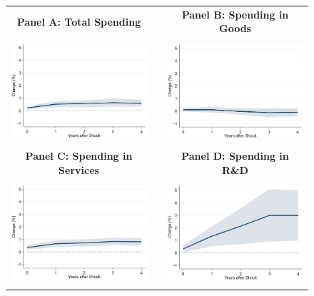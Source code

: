 \documentclass[dv_diss_main.tex]{subfiles}
\begin{document}
\begin{figure}[H]
    \begin{center}
    \begin{tabular}[c]{ccc}
    
    \normalsize{\bf Panel A: Total Spending} & & \normalsize{\bf Panel B: Spending in Goods} \\
    {\includegraphics[height=1.5in,width=2.8in]{figures/graph_Rn_wages_lv_Rn_ms_lv.png}} & & {\includegraphics[height=1.5in,width=2.8in]{figures/graph_Rn_wages_lv_Rn_ms_goods_lv.png}} \\[0.1in]
    
    \normalsize{\bf Panel C: Spending in Services} & & \normalsize{\bf Panel D: Spending in R\&D} \\
    {\includegraphics[height=1.5in,width=2.8in]{figures/graph_Rn_wages_lv_Rn_ms_services_lv.png}} & & {\includegraphics[height=1.5in,width=2.8in]{figures/graph_Rn_wages_lv_Rn_ms_rd_lv.png}} \\[0.1in]
    

\end{tabular}
\end{center}
\end{figure}
\end{document}

